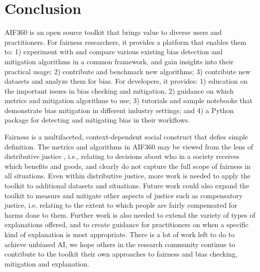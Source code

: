 \documentclass{article}
\begin{document}
\section{Conclusion}
\label{sec:discussion}

AIF360 is an open source toolkit that brings value to diverse users and practitioners.  For fairness researchers, it provides a platform that enables them to: 1) experiment with and compare various existing bias detection and mitigation algorithms in a common framework, and gain insights into their practical usage; 2) contribute and benchmark new algorithms; 3) contribute new datasets and analyze them for bias.  For developers, it provides: 1) education on the important issues in bias checking and mitigation, 2) guidance on which metrics and mitigation algorithms to use; 3) tutorials and sample notebooks that demonstrate bias mitigation in different industry settings; and 4) a Python package for detecting and mitigating bias in their workflows.

Fairness is a multifaceted, context-dependent social construct that defies simple definition. The metrics and algorithms in AIF360 may be viewed from the lens of distributive justice \citep{HuC2018}, i.e., relating to decisions about who in a society receives which benefits and goods, and clearly do not capture the full scope of fairness in all situations. Even within distributive justice, more work is needed to apply the toolkit to additional datasets and situations. Future work could also expand the toolkit to measure and mitigate other aspects of justice such as compensatory justice, i.e. relating to the extent to which people are fairly compensated for harms done to them. Further work is also needed to extend the variety of types of explanations offered, and to create guidance for practitioners on when a specific kind of explanation is most appropriate. There is a lot of work left to do to achieve unbiased AI, we hope others in the research community continue to contribute to the toolkit their own approaches to fairness and bias checking, mitigation and explanation. 


 

\end{document}
